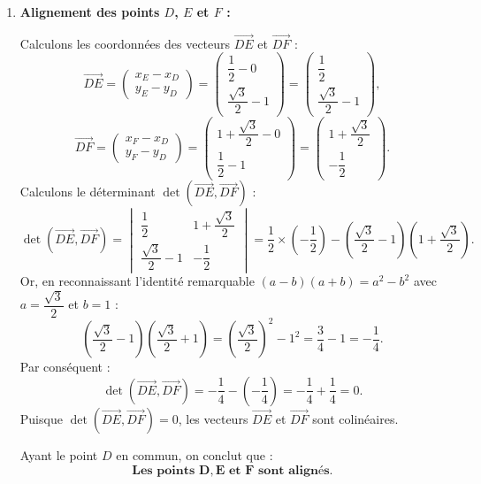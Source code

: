 \documentclass[11pt,a4paper]{article}
\newcommand{\vect}[1]{\overrightarrow{#1}}
\begin{document}
\begin{correctionbox}
\begin{enumerate}
\begin{enumerate}
        \item \textbf{Alignement des points $D$, $E$ et $F$ :}
        
        Calculons les coordonnées des vecteurs $\vect{DE}$ et $\vect{DF}$ :
        \[
        \vect{DE} = \begin{pmatrix} x_E - x_D \\ y_E - y_D \end{pmatrix} = \begin{pmatrix} \dfrac{1}{2} - 0 \\ \dfrac{\sqrt{3}}{2} - 1 \end{pmatrix} = \begin{pmatrix} \dfrac{1}{2} \\ \dfrac{\sqrt{3}}{2} - 1 \end{pmatrix},
        \]
        \[
        \vect{DF} = \begin{pmatrix} x_F - x_D \\ y_F - y_D \end{pmatrix} = \begin{pmatrix} 1 + \dfrac{\sqrt{3}}{2} - 0 \\ \dfrac{1}{2} - 1 \end{pmatrix} = \begin{pmatrix} 1 + \dfrac{\sqrt{3}}{2} \\ -\dfrac{1}{2} \end{pmatrix}.
        \]
        Calculons le déterminant $\det(\vect{DE}, \vect{DF})$ :
        \[
        \det(\vect{DE}, \vect{DF}) = \begin{vmatrix} \dfrac{1}{2} & 1 + \dfrac{\sqrt{3}}{2} \\ \dfrac{\sqrt{3}}{2} - 1 & -\dfrac{1}{2} \end{vmatrix} = \frac{1}{2} \times \left(-\frac{1}{2}\right) - \left(\frac{\sqrt{3}}{2} - 1\right)\left(1 + \frac{\sqrt{3}}{2}\right).
        \]
        Or, en reconnaissant l'identité remarquable $(a - b)(a + b) = a^2 - b^2$ avec $a = \dfrac{\sqrt{3}}{2}$ et $b = 1$ :
        \[
        \left(\frac{\sqrt{3}}{2} - 1\right)\left(\frac{\sqrt{3}}{2} + 1\right) = \left(\frac{\sqrt{3}}{2}\right)^2 - 1^2 = \frac{3}{4} - 1 = -\frac{1}{4}.
        \]
        Par conséquent :
        \[
        \det(\vect{DE}, \vect{DF}) = -\frac{1}{4} - \left(-\frac{1}{4}\right) = -\frac{1}{4} + \frac{1}{4} = 0.
        \]
        Puisque $\det(\vect{DE}, \vect{DF}) = 0$, les vecteurs $\vect{DE}$ et $\vect{DF}$ sont colinéaires.
        
        Ayant le point $D$ en commun, on conclut que :
        \[
        \mathbf{\text{Les points } D, E \text{ et } F \text{ sont alignés}}.
        \]
    \end{enumerate}
\end{enumerate}
\end{correctionbox}
\end{document}

